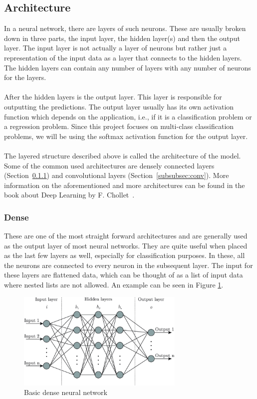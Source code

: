 \documentclass[12pt]{article}
\begin{document}
\subsection{Architecture}\label{subsec:arch}
In a neural network, there are layers of such neurons. These are usually broken down in three parts, the input layer, the hidden layer(s) and then the output layer. The input layer is not actually a layer of neurons but rather just a representation of the input data as a layer that connects to the hidden layers. The hidden layers can contain any number of layers with any number of neurons for the layers.
\\\\
After the hidden layers is the output layer. This layer is responsible for outputting the predictions. The output layer usually has its own activation function which depends on the application, i.e., if it is a classification problem or a regression problem. Since this project focuses on multi-class classification problems, we will be using the softmax activation function for the output layer. 
\\\\
The layered structure described above is called the architecture of the model. Some of the common used architectures are densely connected layers (Section~\ref{subsubsec:dense}) and convolutional layers (Section~\ref{subsubsec:conv}). More information on the aforementioned and more architectures can be found in the book about Deep Learning by F. Chollet~\cite{deeplearning}.
\subsubsection{Dense}\label{subsubsec:dense}
These are one of the most straight forward architectures and are generally used as the output layer of most neural networks. They are quite useful when placed as the last few layers as well, especially for classification purposes. In these, all the neurons are connected to every neuron in the subsequent layer. The input for these layers are flattened data, which can be thought of as a list of input data where nested lists are not allowed. An example can be seen in Figure \ref{fig:densenet}. 
\begin{figure}[H]
	\centering
	\includegraphics[width=8cm]{resources/densenet.png}
	\caption{Basic dense neural network~\cite{bre2018prediction}}
	\label{fig:densenet}
\end{figure}
\end{document}
